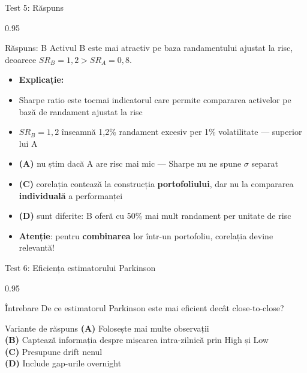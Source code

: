 \documentclass[9pt, aspectratio=169, t]{beamer}
\begin{document}
\begin{frame}[shrink=10]{Test 5: Răspuns}
\begin{cminipage}{0.95\textwidth}
    \begin{exampleblock}{Răspuns: B}
        Activul B este mai atractiv pe baza randamentului ajustat la risc, deoarece $SR_B = 1{,}2 > SR_A = 0{,}8$.
    \end{exampleblock}
    \vspace{0.2cm}
    \begin{itemize}\setlength{\itemsep}{0pt}
        \item \textbf{Explicație:}
        \item Sharpe ratio este tocmai indicatorul care permite compararea activelor pe bază de randament ajustat la risc
        \item $SR_B = 1{,}2$ înseamnă 1{,}2\% randament excesiv per 1\% volatilitate --- superior lui A
        \item \textbf{(A)} nu știm dacă A are risc mai mic --- Sharpe nu ne spune $\sigma$ separat
        \item \textbf{(C)} corelația contează la construcția \textbf{portofoliului}, dar nu la compararea \textbf{individuală} a performanței
        \item \textbf{(D)} sunt diferite: B oferă cu 50\% mai mult randament per unitate de risc
        \item \textbf{Atenție}: pentru \textbf{combinarea} lor într-un portofoliu, corelația devine relevantă!
    \end{itemize}
\end{cminipage}
\end{frame}

\begin{frame}[shrink=10]{Test 6: Eficiența estimatorului Parkinson}
\begin{cminipage}{0.95\textwidth}
    \begin{alertblock}{Întrebare}
        De ce estimatorul Parkinson este mai eficient decât close-to-close?
    \end{alertblock}

    \vspace{0.5cm}
    \begin{block}{Variante de răspuns}
    \textcolor{MainBlue}{\textbf{(A)}} Folosește mai multe observații\\[3pt]
    \textcolor{MainBlue}{\textbf{(B)}} Captează informația despre mișcarea intra-zilnică prin High și Low\\[3pt]
    \textcolor{MainBlue}{\textbf{(C)}} Presupune drift nenul\\[3pt]
    \textcolor{MainBlue}{\textbf{(D)}} Include gap-urile overnight
    \end{block}
\end{cminipage}
\end{frame}
\end{document}
